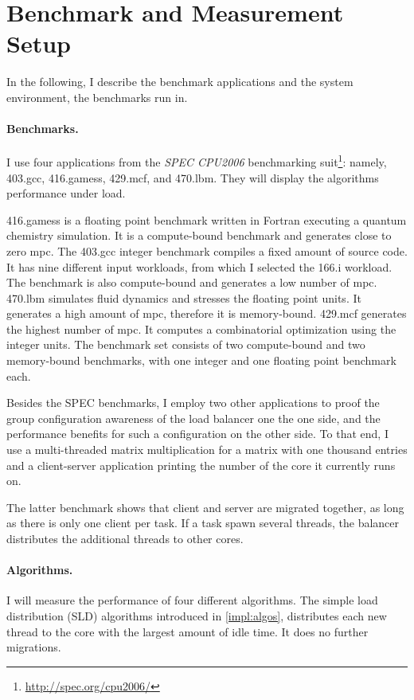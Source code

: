 \section{Benchmark and Measurement Setup}

In the following, I describe the benchmark applications and the
system environment, the benchmarks run in.

\paragraph{Benchmarks.}
I use four applications from the \emph{SPEC CPU2006} benchmarking
suit\footnote{\url{http://spec.org/cpu2006/}}:
namely, 403.gcc, 416.gamess, 429.mcf, and 470.lbm.
They will display the algorithms performance under load.

416.gamess is a floating point benchmark written in Fortran executing a quantum
chemistry simulation.
It is a compute-bound benchmark and generates close to zero \gls{mpc}.
The 403.gcc integer benchmark compiles a fixed amount of source code.
It has nine different input workloads, from which I selected the 166.i
workload.
The benchmark is also compute-bound and generates a low number of \gls{mpc}.
470.lbm simulates fluid dynamics and stresses the floating point units.
It generates a high amount of \gls{mpc}, therefore it is memory-bound.
429.mcf generates the highest number of \gls{mpc}.
It computes a combinatorial optimization using the integer units.
The benchmark set consists of two compute-bound and two memory-bound
benchmarks, with one integer and one floating point benchmark each.

Besides the SPEC benchmarks, I employ two other applications to proof the
group configuration awareness of the load balancer one the one side, and the
performance benefits for such a configuration on the other side.
To that end, I use a multi-threaded matrix multiplication for a matrix with
one thousand entries and a client-server application printing the number of the
core it currently runs on.

The latter benchmark shows that client and server are migrated together, as
long as there is only one client per task.
If a task spawn several threads, the balancer distributes the additional
threads to other cores.


\paragraph{Algorithms.}
I will measure the performance of four different algorithms.
The simple load distribution (SLD) algorithms introduced in \ref{impl:algos},
distributes each new thread to the core with the largest amount of idle time.
It does no further migrations.

